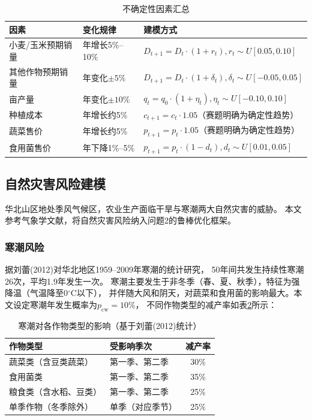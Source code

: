 \documentclass[12pt]{ctexart}
\begin{document}
\begin{table}[H]
\centering
\caption{不确定性因素汇总}
\label{tab:uncertainty_factors}
\begin{tabular}{@{}lll@{}}
\toprule
\textbf{因素} & \textbf{变化规律} & \textbf{建模方式} \\
\midrule
小麦/玉米预期销量 & 年增长5\%--10\% & $D_{t+1}=D_t\cdot(1+r_t), r_t\sim U[0.05,0.10]$ \\
其他作物预期销量 & 年变化$\pm5\%$ & $D_{t+1}=D_t\cdot(1+\delta_t), \delta_t\sim U[-0.05,0.05]$ \\
亩产量 & 年变化$\pm10\%$ & $q_t = q_0\cdot(1+\eta_t), \eta_t\sim U[-0.10,0.10]$ \\
种植成本 & 年增长约5\% & $c_{t+1}=c_t\cdot 1.05$（赛题明确为确定性趋势） \\
蔬菜售价 & 年增长约5\% & $p_{t+1}=p_t\cdot 1.05$（赛题明确为确定性趋势） \\
食用菌售价 & 年下降1\%--5\% & $p_{t+1}=p_t\cdot(1-d_t), d_t\sim U[0.01,0.05]$ \\
\bottomrule
\end{tabular}
\end{table}

\subsection{自然灾害风险建模}

华北山区地处季风气候区，农业生产面临干旱与寒潮两大自然灾害的威胁。
本文参考气象学文献，将自然灾害风险纳入问题2的鲁棒优化框架。

\subsubsection{寒潮风险}

据刘蕾(2012)对华北地区1959--2009年寒潮的统计研究\cite{liu2012}，
50年间共发生持续性寒潮26次，平均1.9年发生一次。
寒潮主要发生于非冬季（春、夏、秋季），特征为强降温（气温降至0$^\circ$C以下），
并伴随大风和阴天，对蔬菜和食用菌的影响最大。本文设定寒潮年发生概率为$p_{\text{cw}}=10\%$，
不同作物类型的减产率如表\ref{tab:cold_wave}所示：

\begin{table}[H]
\centering
\caption{寒潮对各作物类型的影响（基于刘蕾(2012)统计）}
\label{tab:cold_wave}
\begin{tabular}{@{}llc@{}}
\toprule
\textbf{作物类型} & \textbf{受影响季次} & \textbf{减产率} \\
\midrule
蔬菜类（含豆类蔬菜） & 第一季、第二季 & 30\% \\
食用菌类 & 第一季、第二季 & 35\% \\
粮食类（含水稻、豆类） & 第一季、第二季 & 25\% \\
单季作物（冬季除外） & 单季（对应季节） & 25\% \\
\bottomrule
\end{tabular}
\end{table}
\end{document}
